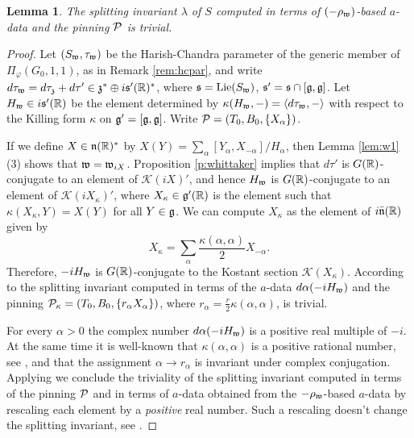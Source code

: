 \documentclass{article}
\newtheorem{lem}[thm]{Lemma}
\theoremstyle{definition}
\numberwithin{equation}{section}
\renewcommand{\-}{\hyp{}}
\newcommand{\g}{\mathfrak g}
\newcommand{\K}{\mathcal K}
\begin{document}
\begin{lem} \label{lem:gen}
The splitting invariant $\lambda$ of $S$ computed in terms of $(-\rho_{\mathfrak{w}})$-based $a$-data and the pinning $\mathcal{P}$ is trivial.
\end{lem}
\begin{proof}
Let $(S_{\mathfrak{w}},\tau_{\mathfrak{w}})$ be the Harish-Chandra parameter of the generic member of $\Pi_\varphi(G_0,1,1)$, as in Remark \ref{rem:hcpar}, and write $d\tau_{\mathfrak{w}}=d\tau_{\mathfrak{z}}+d\tau' \in \mathfrak{z}^* \oplus i\mathfrak{s}'(\mathbb{R})^*$, where $\mathfrak{s}=\textrm{Lie}(S_{\mathfrak{w}})$, $\mathfrak{s}'=\mathfrak{s} \cap [\mathfrak{g},\mathfrak{g}]$. Let $H_{\mathfrak{w}} \in i\mathfrak{s}'(\mathbb{R})$ be the element determined by $\kappa(H_{\mathfrak{w}},-)=\langle d\tau_{\mathfrak{w}},-\rangle$ with respect to the Killing form $\kappa$ on $\mf{g}'=[\g,\g]$. Write $\mathcal{P}=(T_0,B_0,\{X_\alpha\})$.

If we define $X \in \mathfrak{n}(\mathbb{R})^*$ by $X(Y) = \sum_\alpha [Y_\alpha,X_{-\alpha}]/H_\alpha$, then Lemma \ref{lem:w1}(3) shows that $\mathfrak{w}=\mathfrak{w}_{iX}$. Proposition \ref{p:whittaker} implies that $d\tau'$ is $G(\mathbb{R})$-conjugate to an element of $\K(iX)'$, and hence $H_{\mathfrak{w}}$ is $G(\mathbb{R})$-conjugate to an element of $\K(iX_\kappa)'$, where $X_\kappa \in \mathfrak{g}'(\mathbb{R})$ is the element such that $\kappa(X_\kappa,Y)=X(Y)$ for all $Y \in \mathfrak{g}$. We can compute $X_\kappa$ as the element of $i\mathfrak{\bar n}(\mathbb{R})$ given by
\[ X_\kappa = \sum_\alpha \frac{\kappa(\alpha,\alpha)}{2} X_{-\alpha}. \]
Therefore, $-iH_{\mathfrak{w}}$ is $G(\mathbb{R})$-conjugate to the Kostant section $\K(X_\kappa)$. According to \cite[Theorem 5.1]{Kot99} the splitting invariant computed in terms of the $a$-data $d\alpha(-iH_{\mathfrak{w}})$ and the pinning $\mathcal{P}_\kappa=(T_0,B_0,\{r_\alpha X_\alpha\})$, where $r_\alpha = \tfrac{r}{2}\kappa(\alpha,\alpha)$, is trivial.

For every $\alpha>0$ the complex number $d\alpha(-iH_{\mathfrak{w}})$ is a positive real multiple of $-i$. At the same time it is well-known that $\kappa(\alpha,\alpha)$ is a positive rational number, see \cite[\S8.5]{Humphreys80}, and that the assignment $\alpha \to r_\alpha$ is invariant under complex conjugation. Applying \cite[Lemma 5.1]{KalGen} we conclude the triviality of the splitting invariant computed in terms of the pinning $\mathcal{P}$ and in terms of $a$-data obtained from the $-\rho_{\mathfrak{w}}$-based $a$-data by rescaling each element by a \emph{positive} real number. Such a rescaling doesn't change the splitting invariant, see \cite[(2.3.2)]{LS87}. 
\end{proof}





%

\end{document}
